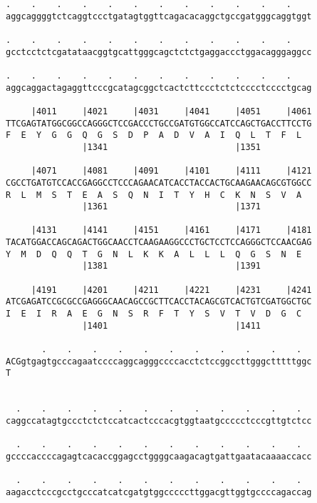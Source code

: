 \documentclass{article}
\begin{document}
\begin{Verbatim}
.    .    .    .    .    .    .    .    .    .    .    .    
aggcaggggtctcaggtccctgatagtggttcagacacaggctgccgatgggcaggtggt
                                                            
.    .    .    .    .    .    .    .    .    .    .    .    
gcctcctctcgatataacggtgcattgggcagctctctgaggaccctggacagggaggcc
                                                            
.    .    .    .    .    .    .    .    .    .    .    .    
aggcaggactagaggttcccgcatagcggctcactcttccctctctcccctcccctgcag
                                                            
     |4011     |4021     |4031     |4041     |4051     |4061
TTCGAGTATGGCGGCCAGGGCTCCGACCCTGCCGATGTGGCCATCCAGCTGACCTTCCTG
F  E  Y  G  G  Q  G  S  D  P  A  D  V  A  I  Q  L  T  F  L  
               |1341                         |1351          
  
     |4071     |4081     |4091     |4101     |4111     |4121
CGCCTGATGTCCACCGAGGCCTCCCAGAACATCACCTACCACTGCAAGAACAGCGTGGCC
R  L  M  S  T  E  A  S  Q  N  I  T  Y  H  C  K  N  S  V  A  
               |1361                         |1371          
  
     |4131     |4141     |4151     |4161     |4171     |4181
TACATGGACCAGCAGACTGGCAACCTCAAGAAGGCCCTGCTCCTCCAGGGCTCCAACGAG
Y  M  D  Q  Q  T  G  N  L  K  K  A  L  L  L  Q  G  S  N  E  
               |1381                         |1391          
  
     |4191     |4201     |4211     |4221     |4231     |4241
ATCGAGATCCGCGCCGAGGGCAACAGCCGCTTCACCTACAGCGTCACTGTCGATGGCTGC
I  E  I  R  A  E  G  N  S  R  F  T  Y  S  V  T  V  D  G  C  
               |1401                         |1411          
  
       .    .    .    .    .    .    .    .    .    .    .  
ACGgtgagtgcccagaatccccaggcagggccccacctctccggccttgggctttttggc
T                                                           
                                                            
  
  .    .    .    .    .    .    .    .    .    .    .    .  
caggccatagtgccctctctccatcactcccacgtggtaatgccccctcccgttgtctcc
                                                            
  .    .    .    .    .    .    .    .    .    .    .    .  
gccccaccccagagtcacaccggagcctggggcaagacagtgattgaatacaaaaccacc
                                                            
  .    .    .    .    .    .    .    .    .    .    .    .  
aagacctcccgcctgcccatcatcgatgtggcccccttggacgttggtgccccagaccag
                                                            

\end{Verbatim}
\end{document}
